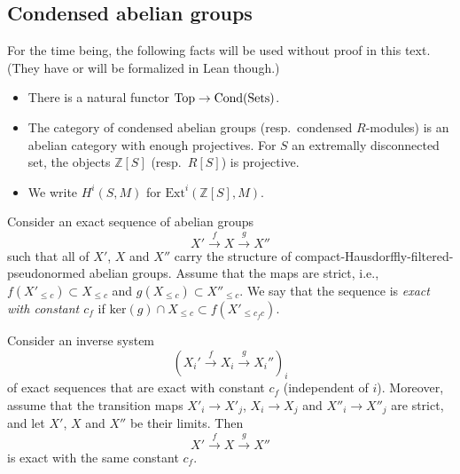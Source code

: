 \subsection{Condensed abelian groups}

\begin{remark}
  For the time being, the following facts will be used without proof in this text.
  (They have or will be formalized in Lean though.)

  \begin{itemize}
    \item There is a natural functor $\operatorname{Top} \to \operatorname{Cond}(\operatorname{Sets})$.
    \item The category of condensed abelian groups (resp.~condensed $R$-modules)
      is an abelian category with enough projectives.
      For $S$ an extremally disconnected set, the objects $\mathbb Z[S]$ (resp.~$R[S]$) is projective.
    \item We write $H^i(S, M)$ for $\text{Ext}^i(\mathbb Z[S], M)$.
  \end{itemize}
\end{remark}

\begin{definition}
  \label{exact-with-constant}
  \leanok
  Consider an exact sequence of abelian groups
  \[ X'\overset{f}{\longrightarrow} X\overset{g}{\longrightarrow} X'' \]
  such that all of $X'$, $X$ and $X''$ carry the structure of compact-Hausdorffly-filtered-pseudonormed abelian groups.
  Assume that the maps are strict, i.e., $f(X'_{\leq c})\subset X_{\leq c}$ and $g(X_{\leq c})\subset X''_{\leq c}$.
  We say that the sequence is \emph{exact with constant $c_f$} if
  $\mathrm{ker}(g)\cap X_{\leq c}\subset f(X'_{\leq c_fc})$.
\end{definition}

\begin{proposition}
  \label{exact-with-constants-lim}
  \leanok
  Consider an inverse system
\[ (X_i'\overset{f}{\longrightarrow} X_i\overset{g}{\longrightarrow} X_i'')_i \]
  of exact sequences that are exact with constant $c_f$ (independent of $i$).
  Moreover, assume that the transition maps $X'_i\to X'_j$, $X_i\to X_j$ and $X''_i\to X''_j$ are strict, and let $X'$, $X$ and $X''$ be their limits.
  Then
  \[ X'\overset{f}{\longrightarrow} X\overset{g}{\longrightarrow} X'' \]
  is exact with the same constant $c_f$.
\end{proposition}

